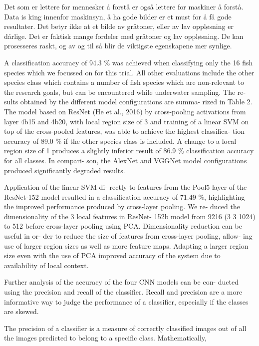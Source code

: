 Det som er lettere for mennesker å forstå er også lettere for maskiner å forstå. Data is king innenfor maskinsyn, å ha gode bilder er et must for å få gode resultater. Det betyr ikke at et bilde av gråtoner, eller av lav oppløsning er dårlige. Det er faktisk mange fordeler med gråtoner og lav oppløsning. De kan prosesseres raskt, og av og til så blir de viktigste egenskapene mer synlige.

A classification accuracy of 94.3 \% was achieved when classifying only the 16 fish species which we focussed on for this trial. All other evaluations include the other species class which contains a number of fish species which are non-relevant to the research goals, but can be encountered while underwater sampling. The re- sults obtained by the different model configurations are summa- rized in Table 2. The model based on ResNet (He et al., 2016) by cross-pooling activations from layer 4b15 and 4b20, with local region size of 3 and training of a linear SVM on top of the cross-pooled features, was able to achieve the highest classifica- tion accuracy of 89.0 \% if the other species class is included. A change to a local region size of 1 produces a slightly inferior result of 86.9 \% classification accuracy for all classes. In compari- son, the AlexNet and VGGNet model configurations produced significantly degraded results.

Application of the linear SVM di- rectly to features from the Pool5 layer of the ResNet-152 model resulted in a classification accuracy of 71.49 \%, highlighting the improved performance produced by cross-layer pooling. We re- duced the dimensionality of the 3 local features in ResNet- 152b model from 9216 (3 3 1024) to 512 before cross-layer pooling using PCA. Dimensionality reduction can be useful in or- der to reduce the size of features from cross-layer pooling, allow- ing use of larger region sizes as well as more feature maps. Adapting a larger region size even with the use of PCA improved accuracy of the system due to availability of local context. 

Further analysis of the accuracy of the four CNN models can be con- ducted using the precision and recall of the classifier. Recall and precision are a more informative way to judge the performance of a classifier, especially if the classes are skewed.

The precision of a classifier is a measure of correctly classified images out of all the images predicted to belong to a specific class. Mathematically,

